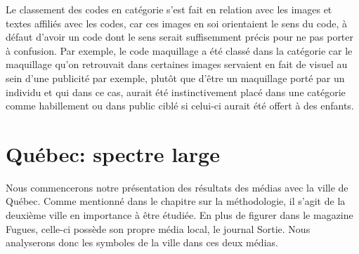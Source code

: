 Le classement des codes en catégorie s'est fait en relation avec les images et textes affiliés avec les codes, car ces images en soi orientaient le sens du code, à défaut d'avoir un code dont le sens serait suffisemment précis pour ne pas porter à confusion. 
Par exemple, le code maquillage a été classé dans la catégorie  car le maquillage qu'on retrouvait dans certaines images servaient en fait de visuel au sein d'une publicité par exemple, plutôt que d'être un maquillage porté par un individu et qui dans ce cas, aurait été instinctivement placé dans une catégorie comme habillement ou dans public ciblé si celui-ci aurait été offert à des enfants.

\section{Québec: spectre large}
\label{sec:qu_bec_spectre_large}
Nous commencerons notre présentation des résultats des médias avec la ville de Québec. 
Comme mentionné dans le chapitre sur la méthodologie, il s'agit de la deuxième ville en importance à être étudiée. 
En plus de figurer dans le magazine Fugues, celle-ci possède son propre média local, le journal Sortie. 
Nous analyserons donc les symboles de la ville dans ces deux médias.

